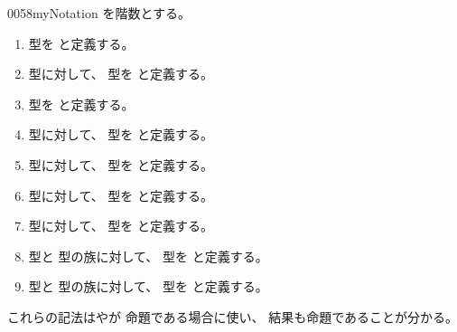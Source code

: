 \documentclass[index]{subfiles}
\begin{document}
\begin{myBlock}{0058}{myNotation}
  を階数とする。
  \begin{enumerate}
  \item 型\myInlineMath{\myTop \myElemOf \myUniverse{\myLevelZero}}を
    \myInlineMath{\myUnitType}と定義する。
  \item 型に対して、
    型を
    と定義する。
  \item 型\myInlineMath{\myBottom \myElemOf \myUniverse{\myLevelZero}}を
    \myInlineMath{\myEmptyType}と定義する。
  \item 型に対して、
    型を
    と定義する。
  \item 型に対して、
    型を
    と定義する。
  \item 型に対して、
    型を
    と定義する。
  \item 型に対して、
    型を
    と定義する。
  \item 型と
    型の族に対して、
    型を
    と定義する。
  \item 型と
    型の族に対して、
    型を
    と定義する。
  \end{enumerate}
  これらの記法はやが
  命題である場合に使い、
  結果も命題であることが分かる。
\end{myBlock}
\end{document}
